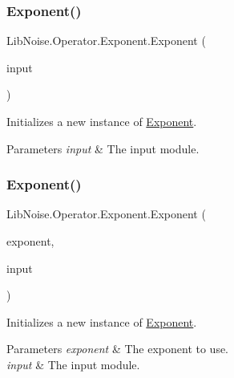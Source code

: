 \subsubsection{\texorpdfstring{Exponent()}{Exponent()}\hspace{0.1cm}{\footnotesize\ttfamily [2/3]}}
{\footnotesize\ttfamily Lib\+Noise.\+Operator.\+Exponent.\+Exponent (\begin{DoxyParamCaption}\item[{\hyperlink{class_lib_noise_1_1_module_base}{Module\+Base}}]{input }\end{DoxyParamCaption})}



Initializes a new instance of \hyperlink{class_lib_noise_1_1_operator_1_1_exponent}{Exponent}. 


\begin{DoxyParams}{Parameters}
{\em input} & The input module.\\
\hline
\end{DoxyParams}
\mbox{\label{class_lib_noise_1_1_operator_1_1_exponent_aed94176bff55b17e1cc22a536ee83a78}} 
\subsubsection{\texorpdfstring{Exponent()}{Exponent()}\hspace{0.1cm}{\footnotesize\ttfamily [3/3]}}
{\footnotesize\ttfamily Lib\+Noise.\+Operator.\+Exponent.\+Exponent (\begin{DoxyParamCaption}\item[{double}]{exponent,  }\item[{\hyperlink{class_lib_noise_1_1_module_base}{Module\+Base}}]{input }\end{DoxyParamCaption})}



Initializes a new instance of \hyperlink{class_lib_noise_1_1_operator_1_1_exponent}{Exponent}. 


\begin{DoxyParams}{Parameters}
{\em exponent} & The exponent to use.\\
\hline
{\em input} & The input module.\\
\hline
\end{DoxyParams}


